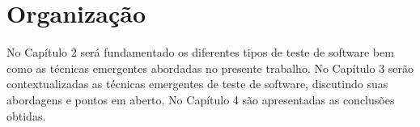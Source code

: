 \section{Organização}
\label{sec:organizacao}

No Capítulo 2 será fundamentado os diferentes tipos de teste de software bem como as técnicas emergentes abordadas no presente trabalho. No Capítulo 3 serão contextualizadas as técnicas emergentes de teste de software, discutindo suas abordagens e pontos em aberto. No Capítulo 4 são apresentadas as conclusões obtidas.